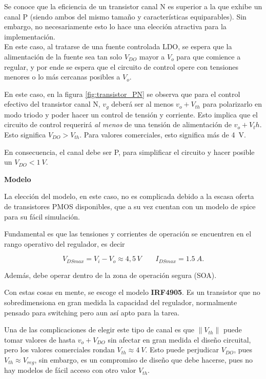 \documentclass[]{article}
\begin{document}
Se conoce que la eficiencia de un transistor canal N es superior a la que exhibe un canal P (siendo ambos del mismo tamaño y características equiparables). Sin embargo, no necesariamente esto lo hace una elección atractiva para la implementación.\\ En este caso, al tratarse de una fuente controlada LDO, se espera que la alimentación de la fuente sea tan solo $V_{DO}$ mayor a $V_{o}$ para que comience a regular, y por ende se espera que el circuito de control opere con tensiones menores o lo más cercanas posibles a $V_{o}$.

En este caso, en la figura \ref{fig:transistor_PN} se observa que para el control efectivo del transistor canal N, $v_g$ deberá ser al menos $v_o + V_{th}$ para polarizarlo en modo triodo y poder hacer un control de tensión y corriente. Esto implica que el circuito de control requerirá \textit{al menos} de una tensión de alimentación de $v_o + V_th$. Esto significa $V_{DO} > V_{th}$. Para valores comerciales, esto significa más de \SI{4}{V}.

En consecuencia, el canal debe ser P, para simplificar el circuito y hacer posible un $V_{DO} < \SI{1}{V}$.

\textbf{Modelo} \par

La elección del modelo, en este caso, no es complicada debido a la escasa oferta de transistores PMOS disponibles, que a su vez cuentan con un modelo de spice para su fácil simulación.

Fundamental es que las tensiones y corrientes de operación se encuentren en el rango operativo del regulador, es decir

$$V_{DSmax} = V_i - V_o \approx 4,5 \,V \qquad I_{DSmax} = \SI{1.5}{A}.$$

Además, debe operar dentro de la zona de operación segura (SOA).

Con estas cosas en mente, se escoge el modelo \textbf{IRF4905}. Es un transistor que no sobredimensiona en gran medida la capacidad del regulador, normalmente pensado para switching pero aun así apto para la tarea.

Una de las complicaciones de elegir este tipo de canal es que $\|V_{th}\|$ puede tomar valores de hasta $v_o + V_{DO}$ sin afectar en gran medida el diseño circuital, pero los valores comerciales rondan $V_{th} \approx \SI{4}{V}$. Esto puede perjudicar $V_{DO}$, pues $V_{th} \approx V_{reg}$, sin embargo, es un compromiso de diseño que debe hacerse, pues no hay modelos de fácil acceso con otro valor $V_{th}$.
\FloatBarrier
\end{document}
